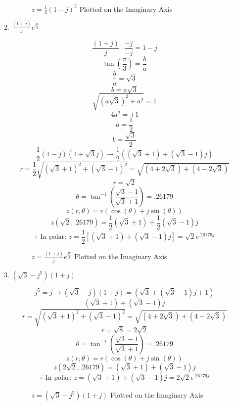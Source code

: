 \begin{enumerate}
\begin{enumerate}
        \begin{figure}[H]
          \centering
          
          \caption{$z=\frac{1}{4}(1-j)^5$ Plotted on the Imaginary Axis}
          \label{fig:4}
        \end{figure}

      \item $\frac{(1+j)}{j}e^{\frac{j\pi}{3}}$

        $$\frac{(1+j)}{j}\cdot\frac{-j}{-j}=1-j$$
        $$\tan\left( \frac{\pi}{3} \right)=\frac{b}{a}$$
        $$\frac{b}{a}=\sqrt{3}$$
        $$b=a\sqrt{3}$$
        $$\sqrt{(a\sqrt{3})^2+a^2}=1$$
        $$4a^2=\pm1$$
        $$a=\frac{1}{2}$$
        $$b=\frac{\sqrt{3}}{2}$$
        $$\frac{1}{2}(1-j)(1+\sqrt{3}j)\to\frac{1}{2}((\sqrt{3}+1)+(\sqrt{3}-1)j)$$
        $$r=\frac{1}{2}\sqrt{(\sqrt{3}+1)^2+(\sqrt{3}-1)^2}=\sqrt{(4+2\sqrt{3})+(4-2\sqrt{3})}$$
        $$r=\sqrt{2}$$
        $$\theta=\tan^{-1}\left( \frac{\sqrt{3}-1}{\sqrt{3}+1} \right)=.26179$$
        $$z(r,\theta)=r(\cos(\theta)+j\sin(\theta))$$
        $$z(\sqrt{2},.26179)=\frac{1}{2}(\sqrt{3}+1)+\frac{1}{2}(\sqrt{3}-1)j$$
        $$\therefore \text{ In polar: } \boxed{z=\frac{1}{2}\left[(\sqrt{3}+1)+(\sqrt{3}-1)j\right]=\sqrt{2}e^{.26179j}}$$

        \begin{figure}[H]
          \centering
          
          \caption{$z=\frac{(1+j)}{j}e^{\frac{j\pi}{3}}$ Plotted on the Imaginary Axis}
          \label{fig:5}
        \end{figure}

      \item $(\sqrt{3}-j^5)(1+j)$

        $$j^5=j\to (\sqrt{3}-j)(1+j)=(\sqrt{3}+(\sqrt{3}-1)j+1)$$
        $$(\sqrt{3}+1)+(\sqrt{3}-1)j$$
        $$r=\sqrt{(\sqrt{3}+1)^2+(\sqrt{3}-1)^2}=\sqrt{(4+2\sqrt{3})+(4-2\sqrt{3})}$$
        $$r=\sqrt{8}=2\sqrt{2}$$
        $$\theta=\tan^{-1}\left( \frac{\sqrt{3}-1}{\sqrt{3}+1} \right)=.26179$$
        $$z(r,\theta)=r(\cos(\theta)+j\sin(\theta))$$
        $$z(2\sqrt{2},.26179)=(\sqrt{3}+1)+(\sqrt{3}-1)j$$
        $$\therefore \text{ In polar: } \boxed{z=(\sqrt{3}+1)+(\sqrt{3}-1)j=2\sqrt{2}e^{.26179j}}$$

        \begin{figure}[H]
          \centering
          
          \caption{$z=(\sqrt{3}-j^5)(1+j)$ Plotted on the Imaginary Axis}
          \label{fig:6}
        \end{figure}


\end{enumerate}
\end{enumerate}
